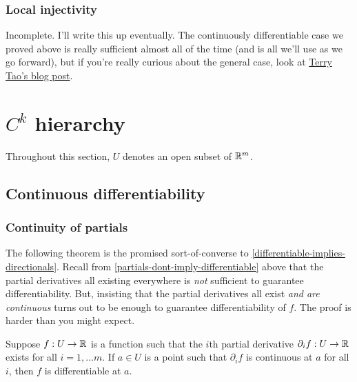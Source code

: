 \subsubsection*{Local injectivity}
	
{\color{blue} Incomplete. I'll write this up eventually. The continuously differentiable case we proved above is really sufficient almost all of the time (and is all we'll use as we go forward), but if you're really curious about the general case, look at \href{https://terrytao.wordpress.com/2011/09/12/the-inverse-function-theorem-for-everywhere-differentiable-maps/#more-5298}{Terry Tao's blog post}.}


\section{\texorpdfstring{$C^k$}{Ck} hierarchy}

Throughout this section, $U$ denotes an open subset of $\mathbb{R}^m$.

\subsection{Continuous differentiability}

\subsubsection*{Continuity of partials}

The following theorem is the promised sort-of-converse to \cref{differentiable-implies-directionals}. Recall from \cref{partials-dont-imply-differentiable} above that the partial derivatives all existing everywhere is \emph{not} sufficient to guarantee differentiability. But, insisting that the partial derivatives all exist \emph{and are continuous} turns out to be enough to guarantee differentiability of $f$. The proof is harder than you might expect. 

\begin{theorem} \label{continuous-partials}
	Suppose $f : U \to \mathbb{R}$ is a function such that the $i$th partial derivative $\partial_i f : U \to \mathbb{R}$ exists for all $i = 1 , \dotsc m$. If $a \in U$ is a point such that $\partial_i f$ is continuous at $a$ for all $i$, then $f$ is differentiable at $a$. 
\end{theorem}

